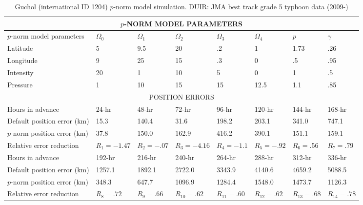 \documentclass{SBCbookchapter}
\begin{document}
  \begin{table}[h]
\centering
\tiny
   \begin{tabular}{|l|l|l|l|l|l|l|l|}
\multicolumn{8}{c}{$p$-NORM MODEL PARAMETERS }\\\hline
$p$-norm model parameters&$\Omega_0$ & $\Omega_1$ & $\Omega_2$ & $\Omega_3$ & $\Omega_4$ & $p$ &$\gamma$\\\hline
Latitude &  5 & 9.5 & 20 & .2 & 1 & 1.73 & .26 \\
Longitude &  9 & 25 & 15 & .3 & 0 & .5 & .95 \\
Intensity &  20 & 1 & 10 & 5 & 0 & 1 & .5 \\
Pressure & 1 &10&15&15&12.5&1.1&.85 \\ \hline \hline
\multicolumn{8}{|c|}{POSITION ERRORS }\\\hline
  Hours in advance   & 24-hr & 48-hr &72-hr &96-hr & 120-hr &   144-hr& 168-hr\\\hline
 Default position error  (km)&  15.3  & 140.4    & 31.6  & 198.2   & 203.1 &  341.0 &747.1 \\\hline
 $p$-norm position error  (km)&  37.8  &  150.0  & 162.9  & 416.2  &  390.1& 151.1&159.1 \\\hline
 Relative error reduction & $R_1= -1.47 $  &$R_2=-.07 $ &$R_3=-4.16 $ &$R_4=-1.1 $ &$R_5=-.92 $ &$R_6=.56 $  &$R_7=.79 $ \\ \hline \hline
   Hours in advance   &  192-hr &216-hr & 240-hr &  264-hr & 288-hr &  312-hr & 336-hr \\\hline
 Default position error  (km)    & 1257.1  & 1892.1   & 2722.0 &3343.9  & 4140.6    & 4659.2  & 5088.5     \\\hline
 $p$-norm position error  (km)  & 348.3  & 647.7  &  1096.9&   1284.4  &  1548.0  & 1473.7  & 1126.3       \\\hline
 Relative error reduction & $R_8=.72 $ &$R_9=.66 $ &$R_{10}=.62 $   & $R_{11}=.60 $  &$R_{12}=.62 $ &$R_{13}=.68 $ &$R_{14}=.78$ \\ \hline \hline
 \end{tabular}
  \caption{Guchol (international ID 1204) $p$-norm model simulation. DUIR:  JMA best track grade 5 typhoon data (2009-)}
  \label{typ3}
 \end{table}
\end{document}
